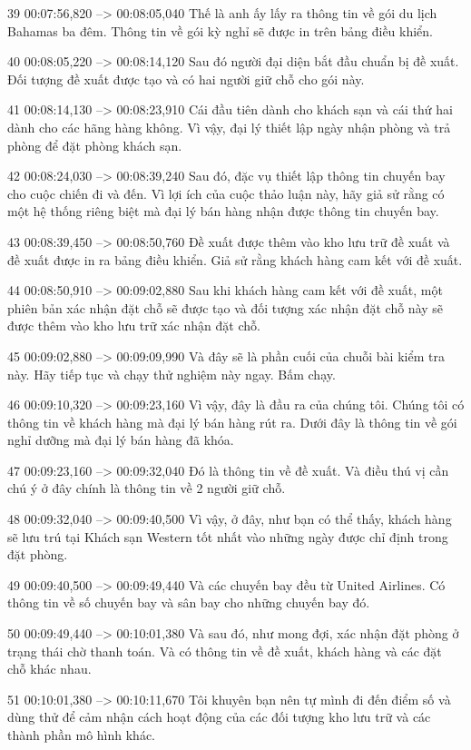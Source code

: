 39
00:07:56,820 --> 00:08:05,040
Thế là anh ấy lấy ra thông tin về gói du lịch Bahamas ba đêm.  Thông tin về gói kỳ nghỉ sẽ được in trên bảng điều khiển.

40
00:08:05,220 --> 00:08:14,120
Sau đó người đại diện bắt đầu chuẩn bị đề xuất.  Đối tượng đề xuất được tạo và có hai người giữ chỗ cho gói này.

41
00:08:14,130 --> 00:08:23,910
Cái đầu tiên dành cho khách sạn và cái thứ hai dành cho các hãng hàng không.  Vì vậy, đại lý thiết lập ngày nhận phòng và trả phòng để đặt phòng khách sạn.

42
00:08:24,030 --> 00:08:39,240
Sau đó, đặc vụ thiết lập thông tin chuyến bay cho cuộc chiến đi và đến.  Vì lợi ích của cuộc thảo luận này, hãy giả sử rằng có một hệ thống riêng biệt mà đại lý bán hàng nhận được thông tin chuyến bay.

43
00:08:39,450 --> 00:08:50,760
Đề xuất được thêm vào kho lưu trữ đề xuất và đề xuất được in ra bảng điều khiển.  Giả sử rằng khách hàng cam kết với đề xuất.

44
00:08:50,910 --> 00:09:02,880
Sau khi khách hàng cam kết với đề xuất, một phiên bản xác nhận đặt chỗ sẽ được tạo và đối tượng xác nhận đặt chỗ này sẽ được thêm vào kho lưu trữ xác nhận đặt chỗ.

45
00:09:02,880 --> 00:09:09,990
Và đây sẽ là phần cuối của chuỗi bài kiểm tra này.  Hãy tiếp tục và chạy thử nghiệm này ngay.  Bấm chạy.

46
00:09:10,320 --> 00:09:23,160
Vì vậy, đây là đầu ra của chúng tôi.  Chúng tôi có thông tin về khách hàng mà đại lý bán hàng rút ra.  Dưới đây là thông tin về gói nghỉ dưỡng mà đại lý bán hàng đã khóa.

47
00:09:23,160 --> 00:09:32,040
Đó là thông tin về đề xuất.  Và điều thú vị cần chú ý ở đây chính là thông tin về 2 người giữ chỗ.

48
00:09:32,040 --> 00:09:40,500
Vì vậy, ở đây, như bạn có thể thấy, khách hàng sẽ lưu trú tại Khách sạn Western tốt nhất vào những ngày được chỉ định trong đặt phòng.

49
00:09:40,500 --> 00:09:49,440
Và các chuyến bay đều từ United Airlines.  Có thông tin về số chuyến bay và sân bay cho những chuyến bay đó.

50
00:09:49,440 --> 00:10:01,380
Và sau đó, như mong đợi, xác nhận đặt phòng ở trạng thái chờ thanh toán.  Và có thông tin về đề xuất, khách hàng và các đặt chỗ khác nhau.

51
00:10:01,380 --> 00:10:11,670
Tôi khuyên bạn nên tự mình đi đến điểm số và dùng thử để cảm nhận cách hoạt động của các đối tượng kho lưu trữ và các thành phần mô hình khác.

